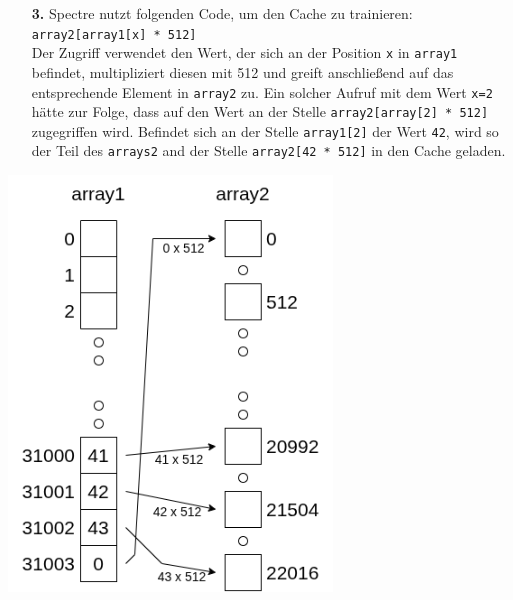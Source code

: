 \noindent
\begin{minipage}{0.58\textwidth}
	\begin{itemize}
		\item[\textbf{3.}] Spectre nutzt folgenden Code, um den Cache zu trainieren: \\
		      \label{itm:spectre_step3_code}
		      \texttt{array2[array1[x] * 512]} \\
		      Der Zugriff verwendet den Wert, der sich an der Position \texttt{x} in \texttt{array1} befindet, multipliziert diesen mit 512 und greift anschließend auf das entsprechende Element in \texttt{array2} zu.
		      Ein solcher Aufruf mit dem Wert \texttt{x=2} hätte zur Folge, dass auf den Wert an der Stelle \texttt{array2[array[2] * 512]} zugegriffen wird.
		      Befindet sich an der Stelle \texttt{array1[2]} der Wert \texttt{42}, wird so der Teil des \texttt{arrays2} and der Stelle \texttt{array2[42 * 512]} in den Cache geladen.
	\end{itemize}
\end{minipage}
\hfill
\begin{minipage}{0.4\textwidth}
	\centering
	\includegraphics[width=\linewidth]{Attack}
\end{minipage}

